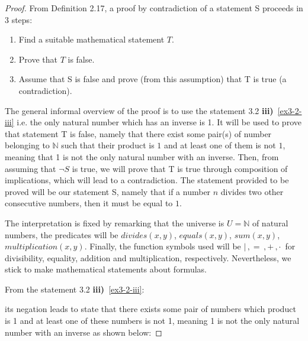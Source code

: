 \documentclass[unicode,11pt,a4paper,oneside,numbers=endperiod,openany]{scrartcl}
\newcommand{\myex}[3]{
    \ifthenelse{\equal{#1}{true}}{
        \begin{equation} \label{#2} \begin{aligned} #3 \end{aligned} \end{equation}
    }{
        \begin{equation*} \label{#2} \begin{aligned} #3 \end{aligned} \end{equation*}
    }
}
\begin{document}
\begin{proof}
    From Definition 2.17, a proof by contradiction of a statement S proceeds in 3 steps:
    \begin{enumerate}
        \item Find a suitable mathematical statement \( T \).
        \item Prove that \( T \) is false.
        \item Assume that S is false and prove (from this assumption) 
            that T is true (a contradiction).
    \end{enumerate}

    The general informal overview of the proof is to use the statement 3.2 
    \textbf{iii)}~\ref{ex3-2-iii} 
    i.e. the only natural number which has an inverse is 1.
    It will be used to prove that statement T is false,
    namely that there exist some pair(s) of number belonging to \( \mathbb{N} \) 
    such that their product is \( 1 \) and at least one of them is not \( 1 \),
    meaning that 1 is not the only natural number with an inverse.
    Then, from assuming that \( \neg S \) is true, 
    we will prove that T is true through composition of implications, 
    which will lead to a contradiction. 
    The statement provided to be proved will be our statement S,
    namely that if a number \( n \) divides two other consecutive numbers, 
    then it must be equal to \( 1 \).


    The interpretation is fixed 
    by remarking that the universe is \( U = \mathbb{N} \) of natural numbers, 
    the predicates will be \( divides(x, y) \), \( equals(x, y) \), 
    \( sum(x,y) \), \( multiplication(x,y) \).
    Finally, the function symbols used will be \( | \,, = \,, + \,, \cdot \, \) 
    for divisibility, equality, addition and multiplication, respectively.
    Nevertheless, we stick to make mathematical statements about formulas.

    From the statement 3.2 \textbf{iii)}~\ref{ex3-2-iii}: 
    \myex{false}{ex8-iii}{
        \forall x \; \forall y \; %
        \left( 
            \left(
                x \cdot y = 1
            \right)
            \rightarrow 
            \left(
                \left( x = 1 \right) 
                \land
                \left( y = 1 \right)
            \right)
        \right)
    }

    its negation leads to state that there exists some pair of numbers which product is 1
    and at least one of these numbers is not 1, 
    meaning 1 is not the only natural number with an inverse as shown below:


\end{proof}
\end{document}
